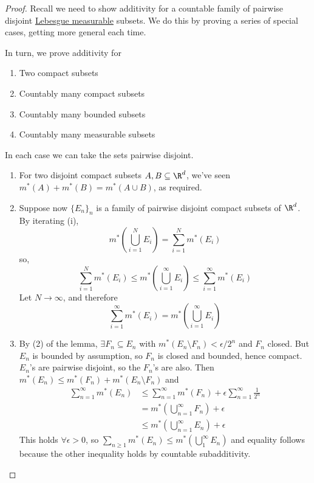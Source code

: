 \documentclass{article}
\newcommand{\1}[1]{\mathbbm{1}_{#1}}
\begin{document}
\begin{proof}
    Recall we need to show additivity for a countable family of pairwise disjoint \hyperlink{def:lebMAble}{Lebesgue measurable} subsets.
    We do this by proving a series of special cases, getting more general each time.

    In turn, we prove additivity for
    \begin{enumerate}[label=(\roman*)]
        \item Two compact subsets
        \item Countably many compact subsets
        \item Countably many bounded subsets
        \item Countably many measurable subsets
    \end{enumerate}
    In each case we can take the sets pairwise disjoint.

    \begin{enumerate}[label=(\roman*)]
        \item For two disjoint compact subsets $A, B \subseteq \R^d$, we've seen $m^*(A) + m^*(B) = m^*(A \cup B)$, as required.

        \item Suppose now $\{E_n\}_n$ is a family of pairwise disjoint compact subsets of $\R^d$. By iterating (i),
            \begin{equation*}
                m^*\left(\bigcup_{i=1}^N E_i\right) = \sum_{i=1}^N m^* (E_i)
            \end{equation*}
            so,
            \begin{equation*}
                \sum_{i=1}^N m^*(E_i) \leq m^*\left(\bigcup_{i=1}^\infty E_i\right) \leq \sum_{i=1}^\infty m^*(E_i)
            \end{equation*}
            Let $N \to \infty$, and therefore
            \begin{equation*}
                \sum_{i=1}^\infty m^*(E_i) = m^*\left(\bigcup_{i=1}^\infty E_i\right)
            \end{equation*}

        \item By (2) of the lemma, $\exists F_n \subseteq E_n$ with $m^*(E_n \setminus F_n) < \epsilon/2^n$ and $F_n$ closed.
            But $E_n$ is bounded by assumption, so $F_n$ is closed and bounded, hence compact.  $E_n$'s are pairwise disjoint, so the $F_n$'s are also.
            Then $m^*(E_n) \leq m^*(F_n) + m^*(E_n \setminus F_n)$ and
            \begin{align*}
                \sum_{n = 1}^\infty m^*(E_n) &\leq \sum_{n=1}^\infty m^*(F_n) + \epsilon \sum_{n = 1}^\infty \frac{1}{2^n} \\
                                             &= m^*\left(\bigcup_{n = 1}^\infty F_n\right) + \epsilon \\
                                             &\leq m^*\left(\bigcup_{n = 1}^\infty E_n\right) + \epsilon
            \end{align*}
            This holds $\forall \epsilon > 0$, so $\sum_{n \geq 1} m^* (E_n) \leq m^*(\bigcup_1^\infty E_n)$
            and equality follows because the other inequality holds by countable subadditivity.


\end{enumerate}
\end{proof}
\end{document}
